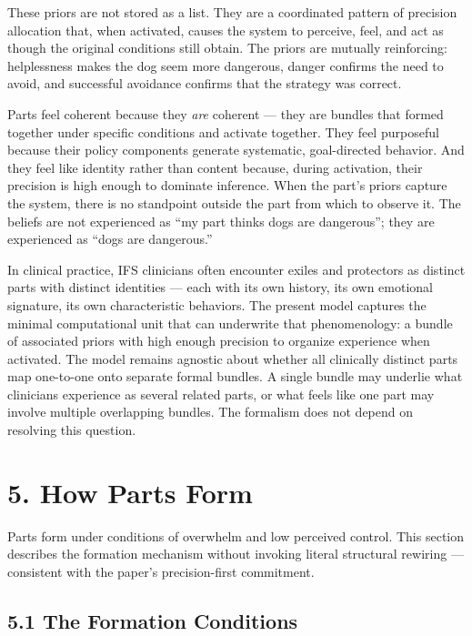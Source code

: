 \documentclass[11pt]{article}
\begin{document}
These priors are not stored as a list. They are a coordinated pattern of
precision allocation that, when activated, causes the system to
perceive, feel, and act as though the original conditions still obtain.
The priors are mutually reinforcing: helplessness makes the dog seem
more dangerous, danger confirms the need to avoid, and successful
avoidance confirms that the strategy was correct.

Parts feel coherent because they \emph{are} coherent --- they are
bundles that formed together under specific conditions and activate
together. They feel purposeful because their policy components generate
systematic, goal-directed behavior. And they feel like identity rather
than content because, during activation, their precision is high enough
to dominate inference. When the part's priors capture the system, there
is no standpoint outside the part from which to observe it. The beliefs
are not experienced as ``my part thinks dogs are dangerous''; they are
experienced as ``dogs are dangerous.''

In clinical practice, IFS clinicians often encounter exiles and
protectors as distinct parts with distinct identities --- each with its
own history, its own emotional signature, its own characteristic
behaviors. The present model captures the minimal computational unit
that can underwrite that phenomenology: a bundle of associated priors
with high enough precision to organize experience when activated. The
model remains agnostic about whether all clinically distinct parts map
one-to-one onto separate formal bundles. A single bundle may underlie
what clinicians experience as several related parts, or what feels like
one part may involve multiple overlapping bundles. The formalism does
not depend on resolving this question.

\section{5. How Parts Form}\label{how-parts-form}

Parts form under conditions of overwhelm and low perceived control. This
section describes the formation mechanism without invoking literal
structural rewiring --- consistent with the paper's precision-first
commitment.

\subsection{5.1 The Formation
Conditions}\label{the-formation-conditions}
\end{document}
